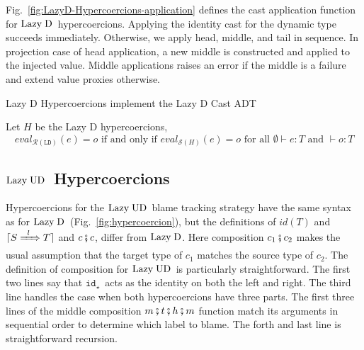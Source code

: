 \documentclass[runningheads]{llncs}
\newcommand{\figref}[1]{Fig.~\ref{#1}}
\newcommand{\LUD}{\ensuremath{\text{Lazy\;UD}}}
\newcommand{\LD}{\ensuremath{\text{Lazy\;D}}}
\newcommand{\RMachine}[1]{\ensuremath{\mathcal{R}(#1)}}
\newcommand{\LDMachine}{\RMachine{\BLD}}
\newcommand{\SMachine}[1]{\ensuremath{\mathcal{S}(#1)}}
\newcommand{\Tdyn}[0]{\ensuremath{\star}}
\newcommand{\ccast}[3]{#1 \xRightarrow[]{\enskip #2 \enskip} #3}
\newcommand{\BLD}[0]{\ensuremath{\mathtt{LD}}}
\newcommand{\cnfid}[1]{\ensuremath{\mathtt{id}_{#1}}}
\newcommand{\hcci}[0]{\cnfid{\Tdyn}}
\newcommand{\compose}[2]{\ensuremath{#1 \fatsemi #2}}
\newcommand{\translate}[1]{\ensuremath{\lceil#1\rceil}}
\newcommand{\id}[1]{\ensuremath{\mathit{id}(#1)}}
\newcommand{\expressiontyping}[3]{\ensuremath{#1 \vdash #2 : #3}}
\newcommand{\valuetyping}[2]{\ensuremath{\vdash #1 : #2}}
\newcommand{\withmachineevalto}[3]{\ensuremath{\mathit{eval}_{#1}(#2)=#3}}
\newcommand{\compatibletailhead}[2]{\ensuremath{#1\;\mathit{R}\;#2}}
\newcommand{\machineequiv}[2]{
	\ensuremath{
		\withmachineevalto{#1}{e}{o}	
		\text{ if and only if }
		\withmachineevalto{#2}{e}{o}
		\text{ for all }
		\expressiontyping{\emptyset}{e}{T}
		\text{ and }
		\valuetyping{o}{T}
	}}
\begin{document}
Fig.~\ref{fig:LazyD-Hypercoercions-application} defines the cast application 
function for \LD\ hypercoercions.
Applying the identity cast for the dynamic type succeeds immediately. 
Otherwise, we apply head, middle, and tail in sequence. 
%
In projection case of head application, a new middle is constructed and applied 
to the injected value.
%
Middle applications raises an error if the middle is a failure and extend value 
proxies otherwise.

\begin{proposition} Lazy D Hypercoercions implement the Lazy D Cast ADT
\end{proposition}
\begin{theorem} Let $H$ be the Lazy D 
hypercoercions,
\[\machineequiv{\LDMachine}{\SMachine{H}}\]
\end{theorem}


\subsection{\LUD\ Hypercoercions} \label{sec:LazyUD-Hypercoercions}

Hypercoercions for the \LUD\ blame tracking strategy have the same syntax
as for \LD\ (\figref{fig:hypercoercion}), but the definitions of $\id{T}$ and
$\translate{\ccast{S}{l}{T}}$ and $\compose{c}{c}$, differ from \LD. Here 
composition $\compose{c_1}{c_2}$ makes the usual assumption that the
target type of $c_1$ matches the source type of $c_2$. 
%
The definition of composition for \LUD\ is particularly straightforward.
The first two lines say that \hcci\ acts as the identity on both the left
and right.
The third line handles the case when both hypercoercions have three parts. 
%
The first three lines of the middle composition $m \fatsemi t \fatsemi h 
\fatsemi m$ function match its arguments in sequential order to determine which 
label to blame. The forth and last line is straightforward recursion.

\todo[inline]{KC: I need a better name for \compatibletailhead{t}{h}}

\end{document}
